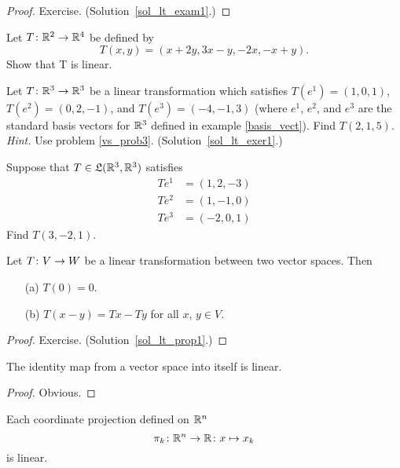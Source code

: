 \begin{proof} Exercise. (Solution~\ref{sol_lt_exam1}.)  \ns  \end{proof}

\begin{prob}  Let $T \colon  \mathbb{R}^2 \rightarrow \mathbb{R}^4$ be defined by
  \[ T(x,y) = (x + 2y, 3x - y, -2x, -x + y). \]
Show that T is linear.
\end{prob}

\begin{exer}\label{lt_exer1}  Let $T \colon  \mathbb{R}^3 \rightarrow \mathbb{R}^3$ be a linear transformation which
satisfies $T(e^1) = (1, 0, 1)$, $T(e^2) = (0, 2, -1)$, and $T(e^3) = (-4, -1, 3)$ (where
$e^1$, $e^2$, and $e^3$ are the standard basis vectors for $\mathbb{R}^3$ defined in example
\ref{basis_vect}).  Find $T(2, 1, 5)$.  \emph{Hint.}  Use problem \ref{vs_prob3}.
(Solution~\ref{sol_lt_exer1}.)
\end{exer}

\begin{prob}  Suppose that $T \in \mathfrak{L}(\mathbb{R}^3,\mathbb{R}^3)$ satisfies
 \begin{align*}
          T e^1 &= (1,2,-3) \\
          T e^2 &= (1,-1,0) \\
          T e^3 &= (-2,0,1)
 \end{align*}
Find $T(3,-2,1)$.
\end{prob}

\begin{prop}\label{lt_prop1} Let $T \colon  V \rightarrow W$ be a linear transformation between two vector
spaces. Then
 \begin{enumerate}
  \item[(a)] $T(0) = 0$.
  \item[(b)] $T(x - y) = Tx - Ty$ for all $x$, $y \in V$.
 \end{enumerate}
\end{prop}

\begin{proof} Exercise.  (Solution~\ref{sol_lt_prop1}.)  \ns  \end{proof}

\begin{exam}  The identity map from a vector space into itself is linear.
\end{exam}

\begin{proof} Obvious.     \end{proof}

\begin{exam}  Each coordinate projection defined on $\mathbb{R}^n$
 \[ \pi_k \colon  \mathbb{R}^n \rightarrow \mathbb{R} \colon  x \mapsto x_k \]
is linear.
\end{exam}

